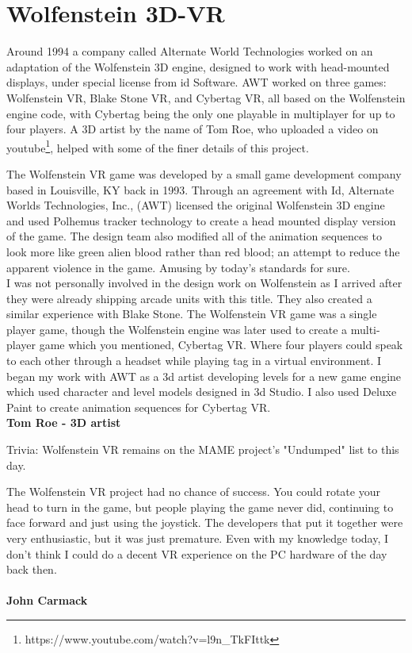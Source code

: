 \section{Wolfenstein 3D-VR}
Around 1994 a company called Alternate World Technologies worked on an adaptation of the Wolfenstein 3D engine, designed to work with head-mounted displays, under special license from id Software. AWT worked on three games: Wolfenstein VR, Blake Stone VR, and Cybertag VR, all based on the Wolfenstein engine code, with Cybertag being the only one playable in multiplayer for up to four players. A 3D artist by the name of Tom Roe, who uploaded a video on youtube\footnote{https://www.youtube.com/watch?v=l9n\_TkFIttk}, helped with some of the finer details of this project.\\

\begin{fancyquotes}
The Wolfenstein VR game was developed by a small game development company based in Louisville, KY back in 1993. Through an agreement with Id, Alternate Worlds Technologies, Inc., (AWT) licensed the original Wolfenstein 3D engine and used Polhemus tracker technology to create a head mounted display version of the game. The design team also modified all of the animation sequences to look more like green alien blood rather than red blood; an attempt to reduce the apparent violence in the game. Amusing by today's standards for sure.
 \bigskip \\
I was not personally involved in the design work on Wolfenstein as I arrived after they were already shipping arcade units with this title. They also created a similar experience with Blake Stone. The Wolfenstein VR game was a single player game, though the Wolfenstein engine was later used to create a multi-player game which you mentioned, Cybertag VR. Where four players could speak to each other through a headset while playing tag in a virtual environment. I began my work with AWT as a 3d artist developing levels for a new game engine which used character and level models designed in 3d Studio. I also used Deluxe Paint to create animation sequences for Cybertag VR.
 \bigskip \\
\textbf{Tom Roe - 3D artist}
 \end{fancyquotes}
\par

Trivia: Wolfenstein VR remains on the MAME project's "Undumped" list to this day.\\
\par
\begin{fancyquotes}
The Wolfenstein VR project had no chance of success.  You could rotate your head to turn in the game, but people playing the game never did, continuing to face forward and just using the joystick.  The developers that put it together were very enthusiastic, but it was just premature.  Even with my knowledge today, I don’t think I could do a decent VR experience on the PC hardware of the day back then.\\
\bigskip \\
\textbf{John Carmack}
 \end{fancyquotes}

